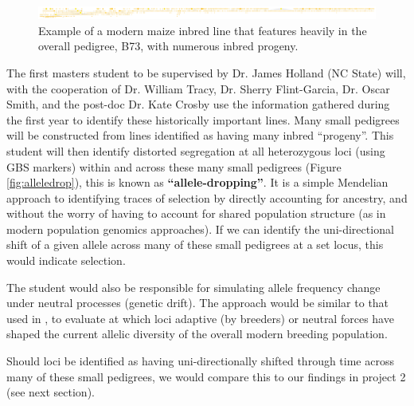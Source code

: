 \documentclass[12pt]{article}
\begin{document}
\begin{figure}[ht]
\includegraphics[width=1.0\linewidth]{pedigree_poster.pdf}
\caption{Example of a modern maize inbred line that features heavily in the overall pedigree, B73, with numerous inbred progeny.}
\label{fig:b73isbig}
\end{figure}

\par The first masters student to be supervised by Dr. James Holland (NC State) will, with the cooperation of Dr. William Tracy, Dr. Sherry Flint-Garcia, Dr. Oscar Smith, and the post-doc Dr. Kate Crosby use the information gathered during the first year to identify these historically important lines. Many small pedigrees will be constructed from lines identified as having many inbred ``progeny''. This student will then identify distorted segregation at all heterozygous loci (using GBS markers) within and across these many small pedigrees (Figure \ref{fig:alleledrop}), this is known as \textbf{``allele-dropping''}. It is a simple Mendelian approach to identifying traces of selection by directly accounting for ancestry, and without the worry of having to account for shared population structure (as in modern population genomics approaches). If we can identify the uni-directional shift of a given allele across many of these small pedigrees at a set locus, this would indicate selection. 
\par The student would also be responsible for simulating allele frequency change under neutral processes (genetic drift). The approach would be similar to that used in \citep{Gerke:2013tw}, to evaluate at which loci adaptive (by breeders) or neutral forces have shaped the current allelic diversity of the overall modern breeding population. 
\par Should loci be identified as having uni-directionally shifted through time across many of these small pedigrees, we would compare this to our findings in project 2 (see next section).
\end{document}
